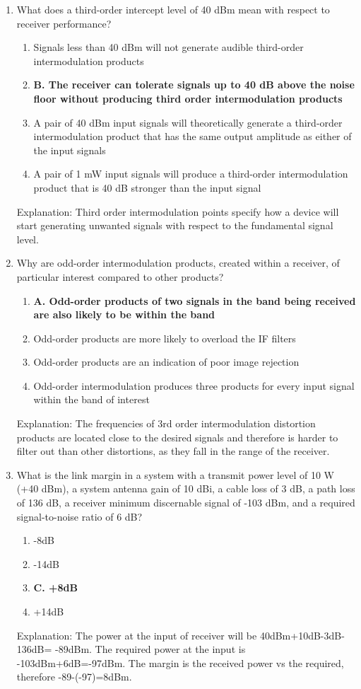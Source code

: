 \begin{enumerate}
    \item What does a third-order intercept level of 40 dBm mean with respect to receiver performance?
         \begin{enumerate}
       \item  Signals less than 40 dBm will not generate audible third-order intermodulation products
        \item \textbf{B. The receiver can tolerate signals up to 40 dB above the noise floor without producing third order intermodulation products}
          \item  A pair of 40 dBm input signals will theoretically generate a third-order intermodulation product that has the same output amplitude as either of the input signals
       \item  A pair of 1 mW input signals will produce a third-order intermodulation product that is 40 dB stronger than the input signal
       \end{enumerate}
     \textcolor{myred}{Explanation:}
      Third order intermodulation points specify how a device will start generating unwanted signals with respect to the fundamental signal level.
        
      \item Why are odd-order intermodulation products, created within a receiver, of particular interest compared to other products?
    \begin{enumerate}
    \item \textbf{A. Odd-order products of two signals in the band being received are also likely to be within the band}
       \item  Odd-order products are more likely to overload the IF filters
        \item  Odd-order products are an indication of poor image rejection
        \item  Odd-order intermodulation produces three products for every input signal within the band of interest
   \end{enumerate}
        \textcolor{myred}{Explanation:}
      The frequencies of 3rd order intermodulation distortion products are located close to the desired signals and therefore is harder to filter out than other distortions, as they fall in the range of the receiver.
        
         \item What is the link margin in a system with a transmit power level of 10 W (+40 dBm), a system antenna gain of 10 dBi, a cable loss of 3 dB, a path loss of 136 dB, a receiver minimum discernable signal of -103 dBm, and a required signal-to-noise ratio of 6 dB?
       \begin{enumerate}
     \item  -8dB
        \item  -14dB
        \item \textbf{C. +8dB}
        \item  +14dB
      \end{enumerate}
   \textcolor{myred}{Explanation:}
     The power at the input of receiver will be 40dBm+10dB-3dB-136dB= -89dBm. The required power at the input is -103dBm+6dB=-97dBm. The margin is the received power vs the required, therefore -89-(-97)=8dBm.


\end{enumerate}
